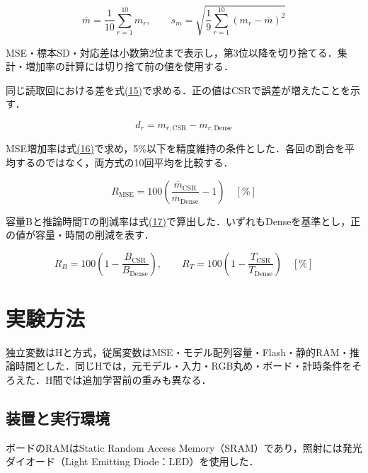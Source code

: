 \documentclass[
  10pt,
  a4paper,
]{article}
\begin{document}
\begin{equation}\label{eq:statistics}
\overline m=\frac1{10}\sum_{r=1}^{10}m_r,\qquad
s_m=\sqrt{\frac1{9}\sum_{r=1}^{10}(m_r-\overline m)^2}
\end{equation}

MSE・標本SD・対応差は小数第2位まで表示し，第3位以降を切り捨てる．集計・増加率の計算には切り捨て前の値を使用する．

同じ読取回における差を式\hyperref[eq:paired-difference]{(15)}で求める．正の値はCSRで誤差が増えたことを示す．

\begin{equation}\label{eq:paired-difference}
d_r=m_{r,\mathrm{CSR}}-m_{r,\mathrm{Dense}}
\end{equation}

MSE増加率は式\hyperref[eq:mse-change]{(16)}で求め，5\%以下を精度維持の条件とした．各回の割合を平均するのではなく，両方式の10回平均を比較する．

\begin{equation}\label{eq:mse-change}
R_{\mathrm{MSE}}=100\left(\frac{\overline m_{\mathrm{CSR}}}{\overline m_{\mathrm{Dense}}}-1\right)\quad[\%]
\end{equation}

容量Bと推論時間Tの削減率は式\hyperref[eq:reductions]{(17)}で算出した．いずれもDenseを基準とし，正の値が容量・時間の削減を表す．

\begin{equation}\label{eq:reductions}
R_B=100\left(1-\frac{B_{\mathrm{CSR}}}{B_{\mathrm{Dense}}}\right),\qquad
R_T=100\left(1-\frac{T_{\mathrm{CSR}}}{T_{\mathrm{Dense}}}\right)\quad[\%]
\end{equation}

\section{実験方法}\label{ux5b9fux9a13ux65b9ux6cd5}

独立変数はHと方式，従属変数はMSE・モデル配列容量・Flash・静的RAM・推論時間とした．同じHでは，元モデル・入力・RGB丸め・ボード・計時条件をそろえた．H間では追加学習前の重みも異なる．

\subsection{装置と実行環境}\label{ux88c5ux7f6eux3068ux5b9fux884cux74b0ux5883}

ボードのRAMはStatic Random Access
Memory（SRAM）であり，照射には発光ダイオード（Light Emitting
Diode：LED）を使用した．
\end{document}
